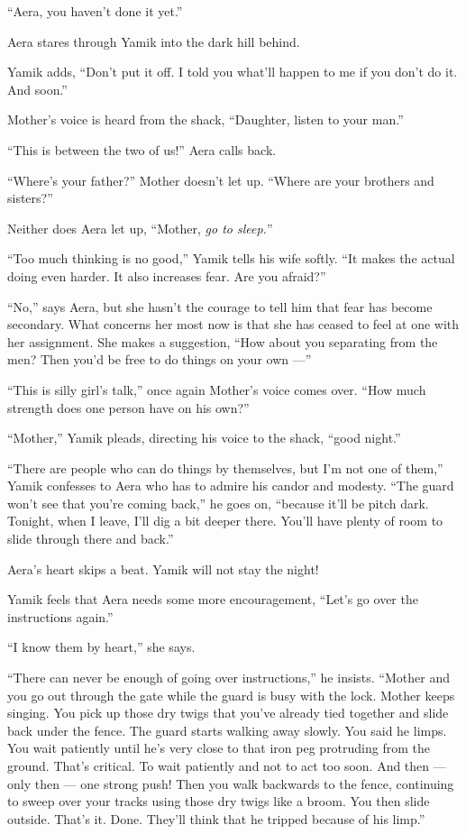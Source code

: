 \documentclass[twoside,11pt,openany]{book}
\begin{document}
``Aera, you haven't done it yet.''

Aera stares through Yamik into the dark hill behind.

Yamik adds, ``Don't put it off. I told you what'll happen to me if you don't do it. And soon.''

Mother's voice is heard from the shack, ``Daughter, listen to your man.''

``This is between the two of us!'' Aera calls back.

``Where's your father?'' Mother doesn't let up. ``Where{ }are your
brothers and sisters?''

Neither does Aera let up, ``Mother, \textit{go to sleep.}{}''

``Too much thinking is no good,'' Yamik tells his wife softly. ``It makes the actual doing
even harder. It also increases fear. Are you afraid?''

``No,'' says Aera, but she hasn't the courage to tell him that fear has become secondary. What concerns her most now
is that she has ceased to feel at one with her assignment. She makes a suggestion, ``How about you separating from the
men?  Then you'd be free to do things on your own ---''

``This is silly girl's talk,'' once again Mother's voice comes over. ``How much strength
does one person have on his own?''

``Mother,'' Yamik pleads, directing his voice to the shack, ``good night.''

``There are people who can do things by themselves, but I'm not one of
them,'' Yamik confesses to Aera who has to admire his candor and
modesty. ``The guard won't see that you're coming back,'' he goes on, ``because it'll be pitch dark. Tonight,
when I leave, I'll dig a bit deeper there. You'll have plenty of room to slide through there and back.''

Aera's heart skips a beat. Yamik will not stay the night!

Yamik feels that Aera needs some more encouragement, ``Let's go over the instructions again.''

``I know them by heart,'' she says.

``There can never be enough of going over instructions,'' he insists.
``Mother and you go
out through the gate while the guard is busy with the lock. Mother keeps singing. You pick up those dry twigs that
you've already tied together and slide back under the fence. The guard starts walking away slowly. You said he limps.
You wait patiently until he's very close to that iron peg protruding from the ground. That's critical. To wait
patiently and not to act too soon. And then ---  only then --- one strong push! Then you walk backwards to the fence,
continuing to sweep over your tracks using those dry twigs like a broom. You
then slide outside. That's it. Done. They'll think that he tripped because
of his limp.''
\end{document}
